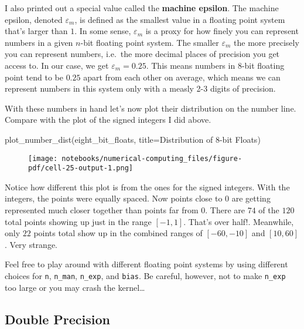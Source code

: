 \documentclass[
  letterpaper,
  DIV=11,
  numbers=noendperiod]{scrreprt}
\newenvironment{Shaded}{\begin{snugshade}}{\end{snugshade}}
\newcommand{\NormalTok}[1]{\textcolor[rgb]{0.00,0.23,0.31}{#1}}
\newcommand{\OperatorTok}[1]{\textcolor[rgb]{0.37,0.37,0.37}{#1}}
\newcommand{\StringTok}[1]{\textcolor[rgb]{0.13,0.47,0.30}{#1}}
\begin{document}
I also printed out a special value called the \textbf{machine epsilon}.
The machine epsilon, denoted \(\varepsilon_m\), is defined as the
smallest value in a floating point system that's larger than \(1\). In
some sense, \(\varepsilon_m\) is a proxy for how finely you can
represent numbers in a given \(n\)-bit floating point system. The
smaller \(\varepsilon_m\) the more precisely you can represent numbers,
i.e.~the more decimal places of precision you get access to. In our
case, we get \(\varepsilon_m=0.25\). This means numbers in 8-bit
floating point tend to be \(0.25\) apart from each other on average,
which means we can represent numbers in this system only with a measly
2-3 digits of precision.

With these numbers in hand let's now plot their distribution on the
number line. Compare with the plot of the signed integers I did above.

\begin{Shaded}
\begin{Highlighting}[]
\NormalTok{plot\_number\_dist(eight\_bit\_floats, title}\OperatorTok{=}\StringTok{\textquotesingle{}Distribution of 8{-}bit Floats\textquotesingle{}}\NormalTok{)}
\end{Highlighting}
\end{Shaded}

\begin{figure}[H]

{\centering \texttt{[image: notebooks/numerical-computing\_files/figure-pdf/cell-25-output-1.png]}

}

\end{figure}

Notice how different this plot is from the ones for the signed integers.
With the integers, the points were equally spaced. Now points close to
\(0\) are getting represented much closer together than points far from
\(0\). There are \(74\) of the \(120\) total points showing up just in
the range \([-1,1]\). That's over half!. Meanwhile, only \(22\) points
total show up in the combined ranges of \([-60,-10]\) and \([10,60]\).
Very strange.

Feel free to play around with different floating point systems by using
different choices for \texttt{n}, \texttt{n\_man}, \texttt{n\_exp}, and
\texttt{bias}. Be careful, however, not to make \texttt{n\_exp} too
large or you may crash the kernel\ldots{}

\hypertarget{double-precision}{%
\subsection{Double Precision}\label{double-precision}}
\end{document}
